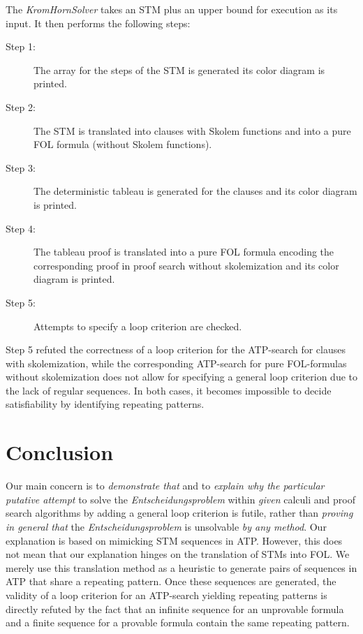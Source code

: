 \documentclass[%
  manuscript=article,   %
  year=2024,
  volume=77,
  doi=10.59203/zfn.77.694,
]{zfn}
\begin{document}
The \emph{KromHornSolver} takes an STM plus an upper bound for execution as its input. It then performs the following steps:
\begin{description}
\item[Step 1:] The array for the steps of the STM is generated its color diagram is printed.
\item[Step 2:] The STM is translated into clauses with Skolem functions and into a pure FOL formula (without Skolem functions).
\item[Step 3:] The deterministic tableau is generated for the clauses and its color diagram is printed.
\item[Step 4:] The tableau proof is translated into a pure FOL formula encoding the corresponding proof in proof search without skolemization and its color diagram is printed.
\item[Step 5:] Attempts to specify a loop criterion are checked.
\end{description}

Step 5 refuted the correctness of a loop criterion for the ATP-search for clauses with skolemization, while the corresponding ATP-search for pure FOL-formulas without skolemization does not allow for specifying a general loop criterion due to the lack of regular sequences. In both cases, it becomes impossible to decide satisfiability by identifying repeating patterns.

\section{Conclusion}\label{discussion}

Our main concern is to \emph{demonstrate that} and to \emph{explain why the particular putative attempt} to solve the \emph{Entscheidungsproblem} within \emph{given} calculi and proof search algorithms by adding a general loop criterion is futile, rather than \emph{proving in general that} the \emph{Entscheidungsproblem} is unsolvable \emph{by any method}. Our explanation is based on mimicking STM sequences in ATP. However, this does not mean that our explanation hinges on the translation of STMs into FOL. We merely use this translation method as a heuristic to generate pairs of sequences in ATP that share a repeating pattern. Once these sequences are generated, the validity of a loop criterion for an ATP-search yielding repeating patterns is directly refuted by the fact that an infinite sequence for an unprovable formula and a finite sequence for a provable formula contain the same repeating pattern.
\end{document}
